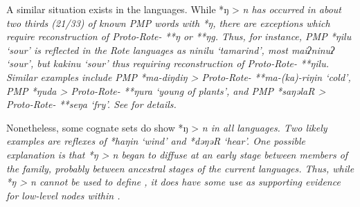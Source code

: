 A similar situation exists in the  languages.
While *ŋ > \it{n} has occurred in about two thirds (21/33) of
known PMP words with *ŋ,
there are exceptions which require reconstruction of Proto-Rote- **ŋ or **ŋg.
Thus, for instance, PMP *ŋilu ‘sour’ is reflected in the Rote
languages as \it{ni{\tl}nilu} ‘tamarind’,
most  \it{maiʔninuʔ} ‘sour’,
but  \it{ka{\tl}kinu} ‘sour’ thus requiring reconstruction of Proto-Rote- **ŋilu.
Similar examples include PMP \mbox{*ma-diŋdiŋ} > Proto-Rote-
**ma-(ka)-riŋin ‘cold’, PMP *ŋuda > Proto-Rote- **ŋura ‘young of plants’,
and PMP *saŋəlaR > Proto-Rote- **seŋa ‘fry’.
See \citet{Edwards2021} for details.

\newpage
Nonetheless, some cognate sets do show *ŋ > \it{n}
in all  languages.
Two likely examples are reflexes of *haŋin ‘wind’ and *dəŋəR ‘hear’.
One possible explanation is that *ŋ > \it{n} began to diffuse
at an early stage between members of the  family,
probably between ancestral stages of the current languages.
Thus, while *ŋ > \it{n} cannot be used to define ,
it does have some use as supporting evidence for low-level nodes within .

